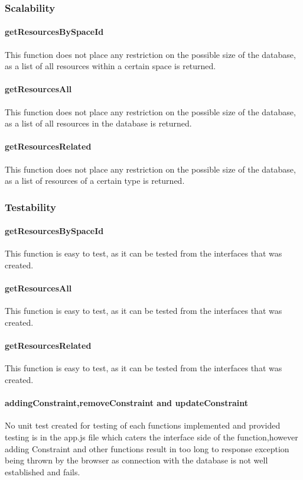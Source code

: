 \documentclass[a4paper]{article}
\begin{document}
\subsubsection {Scalability}

\paragraph{getResourcesBySpaceId}
This function does not place any restriction on the possible size of the database, as a list of all resources within a certain space is returned.

\paragraph{getResourcesAll}
This function does not place any restriction on the possible size of the database, as a list of all resources in the database is returned.

\paragraph{getResourcesRelated}
This function does not place any restriction on the possible size of the database, as a list of resources of a certain type is returned.

\subsubsection {Testability}

\paragraph{getResourcesBySpaceId}
This function is easy to test, as it can be tested from the interfaces that was created.

\paragraph{getResourcesAll}
This function is easy to test, as it can be tested from the interfaces that was created.

\paragraph{getResourcesRelated}
This function is easy to test, as it can be tested from the interfaces that was created.

\paragraph{addingConstraint,removeConstraint and updateConstraint}
No unit test created for testing of each functions implemented and provided testing is in the app.js file which caters the interface side of the function,however adding Constraint and other functions result in too long to response exception being thrown by the browser as connection with the database is not well established and fails.
\end{document}
